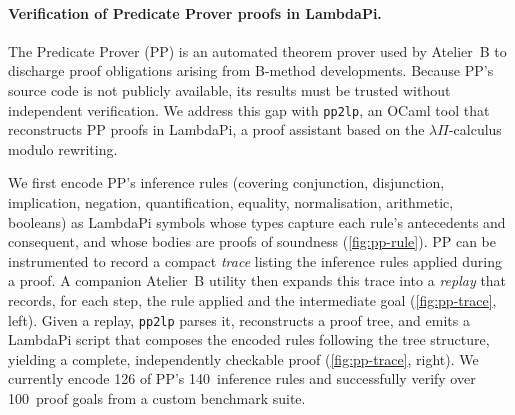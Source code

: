 \documentclass[11pt]{article}
\begin{document}
\paragraph{Verification of Predicate Prover proofs in LambdaPi.}
%
The Predicate Prover (PP) is an automated theorem prover
used by Atelier~B to discharge proof obligations arising from
B-method developments.
%
Because PP's source code is not publicly available,
its results must be trusted without independent verification.
%
We address this gap with \texttt{pp2lp}, an OCaml tool that
reconstructs PP proofs in LambdaPi,
a proof assistant based on the $\lambda\Pi$-calculus modulo rewriting.

We first encode PP's inference rules
(covering conjunction, disjunction, implication,
negation, quantification, equality, normalisation,
arithmetic, booleans)
as LambdaPi symbols whose types capture
each rule's antecedents and consequent, and whose bodies
are proofs of soundness (\autoref{fig:pp-rule}).
%
PP can be instrumented to record a compact
\emph{trace} listing the inference rules applied
during a proof.
%
A companion Atelier~B utility then expands this trace
into a \emph{replay} that records, for each step,
the rule applied and the intermediate goal
(\autoref{fig:pp-trace}, left).
%
Given a replay, \texttt{pp2lp} parses it,
reconstructs a proof tree, and emits a LambdaPi script
that composes the encoded rules following the tree structure,
yielding a complete, independently checkable proof
(\autoref{fig:pp-trace}, right).
%
We currently encode 126 of PP's 140~inference rules
and successfully verify over 100~proof goals from a
custom benchmark suite.
\end{document}
